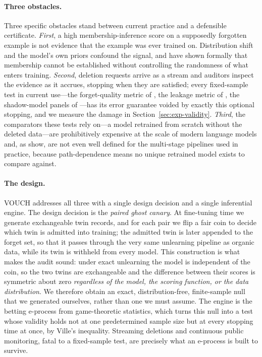 \documentclass[pdflatex,sn-mathphys-num]{sn-jnl}
\theoremstyle{thmstyleone}
\theoremstyle{thmstyletwo}
\theoremstyle{thmstylethree}
\begin{document}
\paragraph{Three obstacles.} Three specific obstacles stand between current practice
and a defensible certificate. \emph{First}, a high membership-inference score on a
supposedly forgotten example is not evidence that the example was ever trained on.
Distribution shift and the model's own priors confound the signal, and
\citet{zhang2024mia} have shown formally that membership cannot be established without
controlling the randomness of what enters training. \emph{Second}, deletion requests
arrive as a stream and auditors inspect the evidence as it accrues, stopping when they
are satisfied; every fixed-sample test in current use---the forget-quality metric of
\citet{maini2024tofu}, the leakage metric of \citet{shi2024muse}, the shadow-model
panels of \citet{hayes2024inexact}---has its error guarantee voided by exactly this
optional stopping, and we measure the damage in Section~\ref{sec:exp-validity}.
\emph{Third}, the comparators these tests rely on---a model retrained from scratch
without the deleted data---are prohibitively expensive at the scale of modern language
models and, as \citet{yu2025impossibility} show, are not even well defined for the
multi-stage pipelines used in practice, because path-dependence means no unique
retrained model exists to compare against.

\paragraph{The design.} VOUCH addresses all three with a single design decision and a
single inferential engine. The design decision is the \emph{paired ghost canary}. At
fine-tuning time we generate exchangeable twin records, and for each pair we flip a
fair coin to decide which twin is admitted into training; the admitted twin is later
appended to the forget set, so that it passes through the very same unlearning pipeline
as organic data, while its twin is withheld from every model. This construction is what
makes the audit sound: under exact unlearning the model is independent of the coin, so
the two twins are exchangeable and the difference between their scores is symmetric
about zero \emph{regardless of the model, the scoring function, or the data
distribution}. We therefore obtain an exact, distribution-free, finite-sample null that
we generated ourselves, rather than one we must assume. The engine is the betting
e-process from game-theoretic statistics, which turns this null into a test whose
validity holds not at one predetermined sample size but at every stopping time at once,
by Ville's inequality. Streaming deletions and continuous public monitoring, fatal to a
fixed-sample test, are precisely what an e-process is built to survive.
\end{document}
